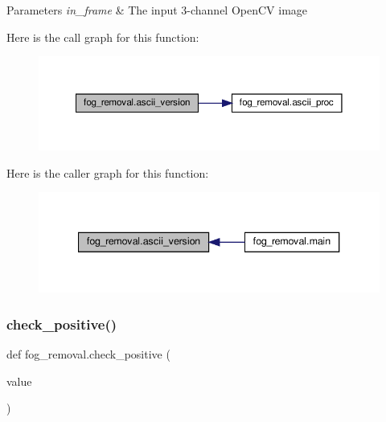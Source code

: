 \begin{DoxyParams}{Parameters}
{\em in\+\_\+frame} & The input 3-\/channel Open\+CV image \\
\hline
\end{DoxyParams}
Here is the call graph for this function\+:\nopagebreak
\begin{figure}[H]
\begin{center}
\leavevmode
\includegraphics[width=350pt]{namespacefog__removal_a6e25df53e59d9d8848b5e2ed5a399ea3_cgraph}
\end{center}
\end{figure}
Here is the caller graph for this function\+:\nopagebreak
\begin{figure}[H]
\begin{center}
\leavevmode
\includegraphics[width=340pt]{namespacefog__removal_a6e25df53e59d9d8848b5e2ed5a399ea3_icgraph}
\end{center}
\end{figure}
\mbox{\label{namespacefog__removal_a7ea01fc3bbbb26aa0f4d20724849308c}} 
\subsubsection{\texorpdfstring{check\+\_\+positive()}{check\_positive()}}
{\footnotesize\ttfamily def fog\+\_\+removal.\+check\+\_\+positive (\begin{DoxyParamCaption}\item[{}]{value }\end{DoxyParamCaption})}



